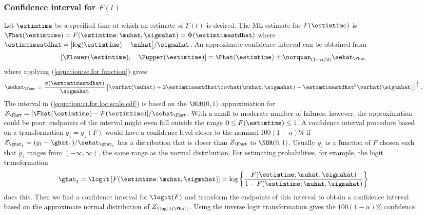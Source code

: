 \subsubsection{Confidence interval for $F(t)$}
\label{section:ci.for.loc.scale.cdf}
Let $\estimtime$ be a specified time at which an estimate of
$F(t)$ is desired.  The ML estimate for $F(\estimtime)$ is
$\Fhat(\estimtime)=
	F(\estimtime; \muhat, \sigmahat) =\Phi(\estimtimestdhat)$
where $\estimtimestdhat=[\log(\estimtime)-\muhat]/\sigmahat$.
An approximate confidence interval can be obtained from
\begin{equation}
\label{equation:ci.for.loc.scale.cdf}
[\Flower(\estimtime), \quad \Fupper(\estimtime) ] = 
\Fhat(\estimtime) \pm \norquan_{(1-\alpha/2)} \sehat_{\Fhat} 	 
\end{equation}
where  applying (\ref{equation:se.for.function}) gives
\begin{equation}
\label{equation:ls.se.fhat}
	\sehat_{\Fhat}
	= \frac{  \phi(\estimtimestdhat )  }{\sigmahat} \left[ \varhat(\muhat) + 
	 2 \estimtimestdhat \covhat(\muhat,\sigmahat) +
	\estimtimestdhat^2 \varhat(\sigmahat) \right]  ^{\frac{1}{2}} .
\end{equation}
The interval in (\ref{equation:ci.for.loc.scale.cdf}) is based on the
$\NOR(0,1)$ approximation for 
$Z_{\Fhat} = [ \Fhat(\estimtime)  -F(\estimtime) ] /
\sehat_{\Fhat}$. With a small to moderate number of failures, however, the
approximation could be poor; endpoints of the interval might even fall
outside the range $0 \leq F(\estimtime) \leq 1$.  A confidence interval
procedure based on a transformation $g_{1}=g_{1}(F)$ would have
a confidence level closer to the nominal $100(1-\alpha)\%$ if
$Z_{\ghat_{1}} = ({g_{1}-\ghat_{1}})/\sehat_{\ghat_{1}}$ 
has a distribution that is closer than $Z_{\Fhat}$ to 
$\NOR(0,1)$.  Usually $g_{1}$ is a function of
$F$ chosen such that $g_{1}$ ranges from $(-\infty, \infty)$,
the same range as the normal distribution.  For estimating
probabilities, for example, the logit transformation
\begin{displaymath} 	
\ghat_{1}= \logit 	 \left [ F(\estimtime;
\muhat, \sigmahat) \right ] 		= 	\log \left \{
\frac{F(\estimtime;\muhat, \sigmahat)} 	 {1-F(\estimtime; \muhat,
\sigmahat)} \right \}  	 
\end{displaymath} 
does this.  Then we find a 
confidence interval for $\logit(F)$ and transform the
endpoints of this interval to obtain a confidence
interval based on the approximate normal distribution of
$Z_{\logit(\Fhat)}$.  Using the
inverse logit transformation gives the $100(1-\alpha)\%$ confidence
